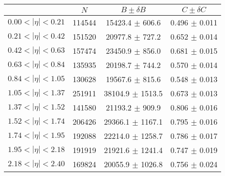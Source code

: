 \begin{tabular}{lccc}
\hline
    &   $N$   & $B \pm \delta B$  &  $C \pm \delta C$ \\
\hline
$0.00 < |\eta| <0.21$          & 114544     & 15423.4    $\pm$ 606.6 & 0.496      $\pm$ 0.011 \\
$0.21 < |\eta| <0.42$          & 151520     & 20977.8    $\pm$ 727.2 & 0.652      $\pm$ 0.014 \\
$0.42 < |\eta| <0.63$          & 157474     & 23450.9    $\pm$ 856.0 & 0.681      $\pm$ 0.015 \\
$0.63 < |\eta| <0.84$          & 135935     & 20198.7    $\pm$ 744.2 & 0.570      $\pm$ 0.014 \\
$0.84 < |\eta| <1.05$          & 130628     & 19567.6    $\pm$ 815.6 & 0.548      $\pm$ 0.013 \\
$1.05 < |\eta| <1.37$          & 251911     & 38104.9    $\pm$ 1513.5 & 0.673      $\pm$ 0.013 \\
$1.37 < |\eta| <1.52$          & 141580     & 21193.2    $\pm$ 909.9 & 0.806      $\pm$ 0.016 \\
$1.52 < |\eta| <1.74$          & 206426     & 29366.1    $\pm$ 1167.1 & 0.795      $\pm$ 0.016 \\
$1.74 < |\eta| <1.95$          & 192088     & 22214.0    $\pm$ 1258.7 & 0.786      $\pm$ 0.017 \\
$1.95 < |\eta| <2.18$          & 191919     & 21921.6    $\pm$ 1241.4 & 0.747      $\pm$ 0.019 \\
$2.18 < |\eta| <2.40$          & 169824     & 20055.9    $\pm$ 1026.8 & 0.756      $\pm$ 0.024 \\
\hline
\end{tabular}
